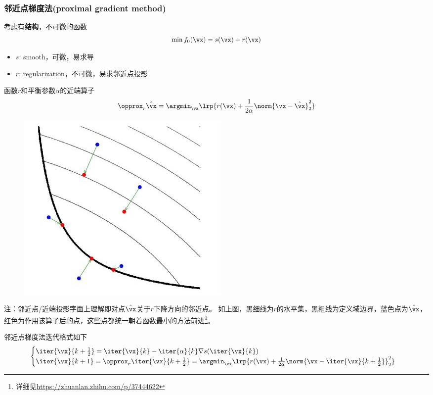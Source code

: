 \subsubsection{邻近点梯度法(proximal gradient method)}
考虑有\textbf{结构}，不可微的函数
\[\min f_0(\vx)=s(\vx)+r(\vx)\]
\begin{itemize}
    \item $s$: smooth，可微，易求导
    \item $r$: regularization，不可微，易求邻近点投影
\end{itemize}

\begin{definition}
    函数$r$和平衡参数$\alpha$的近端算子
\[\opprox_r \hat{\vx}=\argmin_\vx \lrp{r(\vx)+\frac{1}{2\alpha}\norm{\vx-\hat{\vx}}_2^2}\]
\begin{figure}[H]
    \centering
    \includegraphics[width=0.4\linewidth]{fig/prox.jpg}
\end{figure}
注：邻近点/近端投影字面上理解即对点$\hat{\vx}$关于$r$下降方向的邻近点。
如上图，黑细线为$r$的水平集，黑粗线为定义域边界，蓝色点为$\hat{\vx}$，红色为作用该算子后的点，这些点都统一朝着函数最小的方法前进\footnote{详细见\url{https://zhuanlan.zhihu.com/p/37444622}}。
\end{definition}
邻近点梯度法迭代格式如下
\[\begin{cases}
    \iter{\vx}{k+\frac{1}{2}}=\iter{\vx}{k}-\iter{\alpha}{k}\nabla s(\iter{\vx}{k})\\
    \iter{\vx}{k+1}=\opprox_{r}\iter{\vx}{k+\frac{1}{2}}=\argmin_\vx\lrp{r(\vx)+\frac{1}{2\alpha}\norm{\vx-\iter{\vx}{k+\frac{1}{2}}}_2^2}
\end{cases}\]

